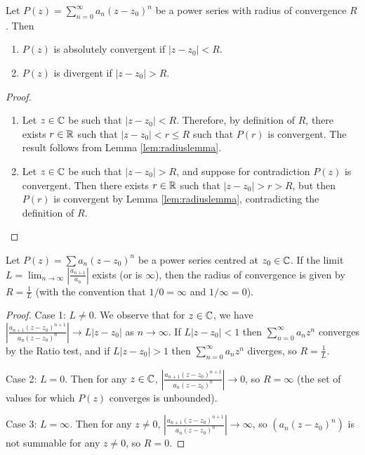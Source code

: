 \documentclass[../analysis1.tex]{subfiles}
\begin{document}
\begin{theorem}
    \begin{shaded*}
        Let $P(z)=\sum_{n=0}^{\infty}a_n(z-z_0)^n$ be a power series with radius of convergence $R$. Then
        \begin{enumerate}
            \item[1.] $P(z)$ is absolutely convergent if $|z-z_0|<R$.
            \item[2.] $P(z)$ is divergent if $|z-z_0|>R$.
        \end{enumerate}
    \end{shaded*}
\end{theorem}
\begin{proof}
    \begin{enumerate}
        \item[1.] Let $z\in\mathbb{C}$ be such that $|z-z_0|<R$. Therefore, by definition of $R$, there exists $r\in\mathbb{R}$ such that $|z-z_0|<r\le R$ such that $P(r)$ is convergent. The result follows from Lemma \ref{lem:radiuslemma}.
        \item[2.] Let $z\in\mathbb{C}$ be such that $|z-z_0|>R$, and suppose for contradiction $P(z)$ is convergent. Then there exists $r\in\mathbb{R}$ such that $|z-z_0|>r>R$, but then $P(r)$ is convergent by Lemma \ref{lem:radiuslemma}, contradicting the definition of $R$.\qedhere
    \end{enumerate}
\end{proof}

\begin{theorem}
    \begin{shaded*}
        Let $P(z) = \sum a_n (z-z_0)^n$ be a power series centred at $z_0\in\mathbb{C}$. If the limit $L = \lim_{n\to\infty} \left| \frac{a_{n+1}}{a_n} \right|$ exists (or is $\infty$), then the radius of convergence is given by $R = \frac{1}{L}$ (with the convention that $1/0 = \infty$ and $1/\infty = 0$).
    \end{shaded*}
\end{theorem}

\begin{proof}
    Case 1: $L\ne 0$. We observe that for $z\in\mathbb{C}$, we have $\left|\frac{a_{n+1}(z-z_0)^{n+1}}{a_n(z-z_0)^n}\right|\to L|z-z_0|$ as $n\to\infty$. If $L|z-z_0|<1$ then $\sum_{n=0}^{\infty}a_nz^n$ converges by the Ratio test, and if $L|z-z_0|>1$ then $\sum_{n=0}^{\infty}a_nz^n$ diverges, so $R=\frac{1}{L}$.\par
    Case 2: $L=0$. Then for any $z\in\mathbb{C}$, $\left|\frac{a_{n+1}(z-z_0)^{n+1}}{a_n(z-z_0)^n}\right|\to 0$, so $R=\infty$ (the set of values for which $P(z)$ converges is unbounded).\par
    Case 3: $L=\infty$. Then for any $z\ne 0$, $\left|\frac{a_{n+1}(z-z_0)^{n+1}}{a_n(z-z_0)^n}\right|\to \infty$, so $(a_n(z-z_0)^n)$ is not summable for any $z\ne 0$, so $R=0$.\qedhere
\end{proof}
\end{document}
